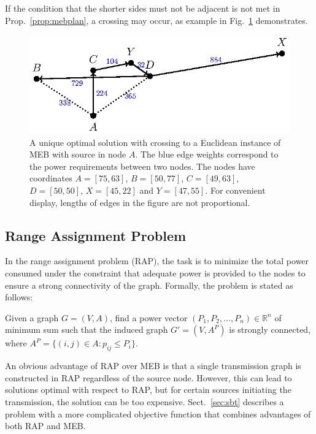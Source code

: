 If the condition that the shorter sides must not be adjacent is not met in Prop.~\ref{prop:mebplan}, a crossing may occur, as example in Fig.~\ref{fig:mebnonplan} demonstrates.
\begin{figure}[htb!]
  \centering
  \includegraphics[scale=1.4]{figurer/mebnonplanar.eps}
  \caption{A unique optimal solution with crossing to a Euclidean instance of  MEB with source in node $A$.
  The blue edge weights correspond to the power requirements between two nodes. 
  The nodes have coordinates $A=[75,63]$, $B=[50,77]$, $C=[49,63]$, $D=[50,50]$, $X=[45,22]$ and $Y=[47,55]$.
  For convenient display, lengths of edges in the figure are not proportional.}
  \label{fig:mebnonplan}
\end{figure}

\subsection{Range Assignment Problem}

In the range assignment problem (RAP), the task is to minimize the total power consumed under the constraint 
that adequate power is provided to the nodes to ensure a strong connectivity of the graph.
Formally, the problem is stated as follows:
\begin{problem}
Given a graph $G=(V,A)$, find a power vector $(P_1,P_2,\dots,P_n)\in\mathbb{R}^n$ of minimum sum such that the induced graph $G'=(V,A^P)$ is strongly connected, 
where $A^P=\{(i,j)\in A: p_{ij}\leq P_i\}$.
\end{problem}

An obvious advantage of RAP over MEB is that a single transmission graph is constructed in RAP regardless of the source node.
However, this can lead to solutions optimal with respect to RAP, but for certain sources initiating the transmission, the solution can be too expensive.
Sect.~\ref{sec:sbt} describes a problem with a more complicated objective function that combines advantages of both RAP and MEB.

